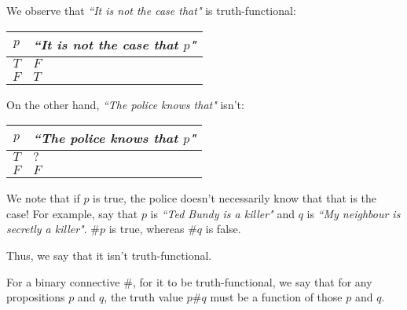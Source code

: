 \documentclass[openany]{book}
\begin{document}
\begin{example}
	We observe that \textit{``It is not the case that"} is truth-functional:
	\begin{center}
		\begin{tabularx}{150pt}{c|X}
			$p$ & \textit{``It is not the case that $p$"} \\
			\hline
			$T$ & $F$ \\
			\hline
			$F$ & $T$
		\end{tabularx}
	\end{center}

	On the other hand, \textit{``The police knows that"} isn't:
	\begin{center}
		\begin{tabularx}{150pt}{c|X}
			$p$ & \textit{``The police knows that $p$"} \\
			\hline
			$T$ & $?$ \\
			\hline
			$F$ & $F$
		\end{tabularx}
	\end{center}

	We note that if $p$ is true, the police doesn't necessarily know that that is the case! For example, say that $p$ is \textit{``Ted Bundy is a killer"} and $q$ is \textit{``My neighbour is secretly a killer"}. $\#p$ is true, whereas $\#q$ is false. 
	
	Thus, we say that it isn't truth-functional.
\end{example}

For a binary connective $\#$, for it to be truth-functional, we say that for any propositions $p$ and $q$, the truth value $p\#q$ must be a function of those $p$ and $q$.
\end{document}
